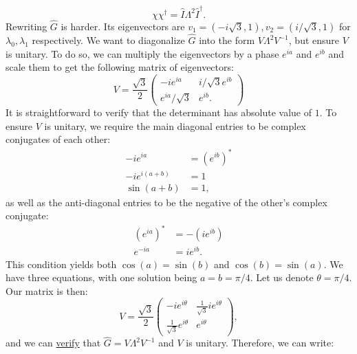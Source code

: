 \documentclass{article}
\numberwithin{equation}{section}
\begin{document}
\begin{enumerate}
    \begin{equation}
        \chi\chi^\dagger = \hat{I}\Lambda^2\hat{I}^\dagger.
    \end{equation}
    Rewriting $\hat{G}$ is harder. Its eigenvectors are $v_1=(-i\sqrt{3},1), v_2=(i/\sqrt{3}, 1)$ for $\lambda_0,\lambda_1$ respectively. We want to diagonalize $\hat{G}$ into the form $V\Lambda^2V^{-1}$, but ensure $V$ is unitary. To do so, we can multiply the eigenvectors by a phase $e^{ia}$ and $e^{ib}$ and scale them to get the following matrix of eigenvectors:
    \begin{equation}
        V = \frac{\sqrt{3}}{2}\begin{pmatrix}
            -i e^{ia} & i/\sqrt{3} e^{ib} \\ 
            e^{ia}/\sqrt{3} & e^{ib}.
        \end{pmatrix}
    \end{equation}
    It is straightforward to verify that the determinant has absolute value of $1$. To ensure $V$ is unitary, we require the main diagonal entries to be complex conjugates of each other:
    \begin{align*}
        -ie^{ia} &= \left(e^{ib}\right)^* \\ 
        -ie^{i(a+b)} &= 1 \\ 
        \sin(a+b) &= 1,
    \end{align*}
    as well as the anti-diagonal entries to be the negative of the other's complex conjugate:
    \begin{align*}
        (e^{ia})^* &= -(ie^{ib}) \\ 
        e^{-ia} &= ie^{ib}.
    \end{align*}
    This condition yields both $\cos(a)=\sin(b)$ and $\cos(b)=\sin(a)$. We have three equations, with one solution being $a=b=\pi/4$. Let us denote $\theta = \pi/4$. Our matrix is then:
    \begin{equation}
        V = \frac{\sqrt{3}}{2} \begin{pmatrix}
            -ie^{i\theta} & \frac{1}{\sqrt{3}} ie^{i\theta} \\ 
            \frac{1}{\sqrt{3}}e^{i\theta} & e^{i\theta}
        \end{pmatrix},
    \end{equation}
    and we can \href{https://www.wolframalpha.com/input/?i=\%7B\%7B-i*e\%5E\%28i*pi\%2F4\%29\%2C+i\%2Fsqrt\%283\%29*e\%5E\%28i*pi\%2F4\%29\%7D\%2C\%7Be\%5E\%28i*pi\%2F4\%29\%2Fsqrt\%283\%29\%2Ce\%5E\%28i*pi\%2F4\%29\%7D\%7D*\%7B\%7B9\%2F25\%2C+0\%7D\%2C\%7B0\%2C16\%2F25\%7D\%7D*\%7B\%7B\%283+E\%5E\%28\%28I\%2F4\%29+Pi\%29\%29\%2F4\%2C+\%28-I\%2F4\%29+Sqrt\%5B3\%5D+E\%5E\%28\%28I\%2F4\%29+Pi\%29\%7D\%2C+\%7B-\%28Sqrt\%5B3\%5D+E\%5E\%28\%28I\%2F4\%29+Pi\%29\%29\%2F4\%2C+\%28\%28-3+I\%29\%2F4\%29+E\%5E\%28\%28I\%2F4\%29+Pi\%29\%7D\%7D}{verify} that $\hat{G} = V\Lambda^2V^{-1}$ and $V$ is unitary. Therefore, we can write:

\end{enumerate}
\end{document}

